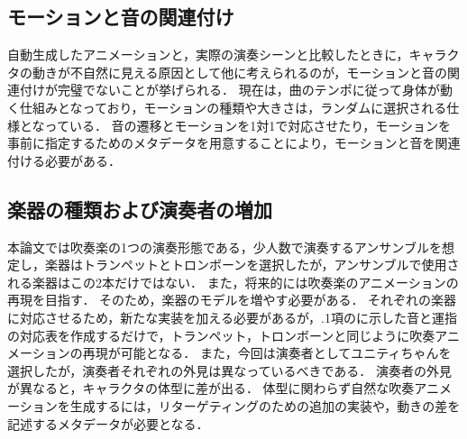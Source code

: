 \subsection{モーションと音の関連付け}
自動生成したアニメーションと，実際の演奏シーンと比較したときに，キャラクタの動きが不自然に見える原因として他に考えられるのが，モーションと音の関連付けが完璧でないことが挙げられる．
現在は，曲のテンポに従って身体が動く仕組みとなっており，モーションの種類や大きさは，ランダムに選択される仕様となっている．
音の遷移とモーションを1対1で対応させたり，モーションを事前に指定するためのメタデータを用意することにより，モーションと音を関連付ける必要がある．

\subsection{楽器の種類および演奏者の増加}
本論文では吹奏楽の1つの演奏形態である，少人数で演奏するアンサンブルを想定し，楽器はトランペットとトロンボーンを選択したが，アンサンブルで使用される楽器はこの2本だけではない．
また，将来的には吹奏楽のアニメーションの再現を目指す．
そのため，楽器のモデルを増やす必要がある．
それぞれの楽器に対応させるため，新たな実装を加える必要があるが，{.1項}のに示した音と運指の対応表を作成するだけで，トランペット，トロンボーンと同じように吹奏アニメーションの再現が可能となる．
また，今回は演奏者としてユニティちゃんを選択したが，演奏者それぞれの外見は異なっているべきである．
演奏者の外見が異なると，キャラクタの体型に差が出る．
体型に関わらず自然な吹奏アニメーションを生成するには，リターゲティングのための追加の実装や，動きの差を記述するメタデータが必要となる．